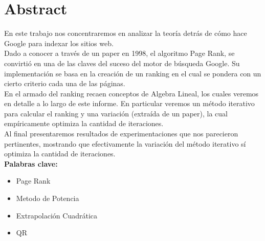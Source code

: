 \section{Abstract}

En este trabajo nos concentraremos en analizar la teoría detrás de cómo hace Google para indexar los sitios web.\\

Dado a conocer a través de un paper en 1998, el algoritmo Page Rank, se convirtió en una de las claves del suceso del motor de búsqueda Google. Su implementación se basa en la creación de un ranking en el cual se pondera con un cierto criterio cada una de las páginas.\\

En el armado del ranking recaen conceptos de Algebra Lineal, los cuales veremos en detalle a lo largo de este informe. En particular veremos un método iterativo para calcular el ranking y una variación (extraída de un paper), la cual empíricamente optimiza la cantidad de iteraciones.\\

Al final presentaremos resultados de experimentaciones que nos parecieron pertinentes, mostrando que efectivamente la variación del método iterativo sí optimiza la cantidad de iteraciones.\\

{\bf Palabras clave:}
\begin{itemize} 
    \item Page Rank
    \item Metodo de Potencia
    \item Extrapolación Cuadrática
    \item QR
\end{itemize}
